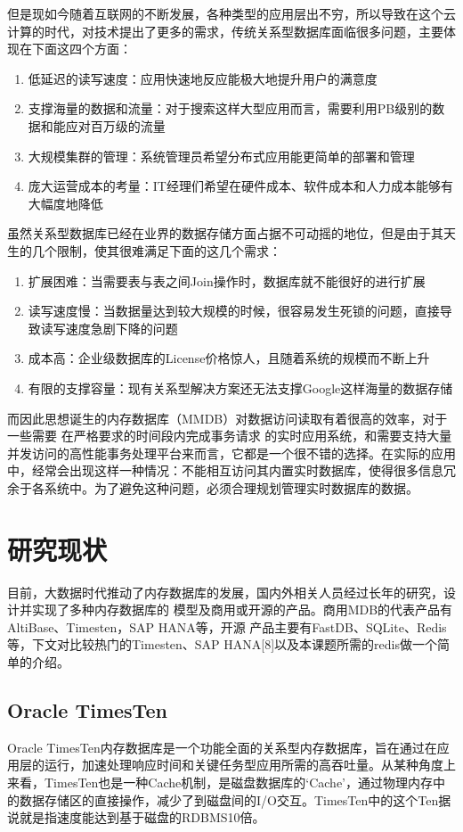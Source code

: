 \documentclass[proposal]{zjutreport}
\begin{document}
但是现如今随着互联网的不断发展，各种类型的应用层出不穷，所以导致在这个云计算的时代，对技术提出了更多的需求，传统关系型数据库面临很多问题，主要体现在下面这四个方面：
\begin{enumerate}[label=（\arabic*）]
\item{低延迟的读写速度：应用快速地反应能极大地提升用户的满意度}
\item{支撑海量的数据和流量：对于搜索这样大型应用而言，需要利用PB级别的数据和能应对百万级的流量}
\item{大规模集群的管理：系统管理员希望分布式应用能更简单的部署和管理}
\item{庞大运营成本的考量：IT经理们希望在硬件成本、软件成本和人力成本能够有大幅度地降低}
\end{enumerate}

虽然关系型数据库已经在业界的数据存储方面占据不可动摇的地位，但是由于其天生的几个限制，使其很难满足下面的这几个需求：
\begin{enumerate}[label=（\arabic*）]
\item{扩展困难：当需要表与表之间Join操作时，数据库就不能很好的进行扩展}
\item{读写速度慢：当数据量达到较大规模的时候，很容易发生死锁的问题，直接导致读写速度急剧下降的问题}
\item{成本高：企业级数据库的License价格惊人，且随着系统的规模而不断上升}
\item{有限的支撑容量：现有关系型解决方案还无法支撑Google这样海量的数据存储}
\end{enumerate}

而因此思想诞生的内存数据库（MMDB）对数据访问读取有着很高的效率，对于一些需要
在严格要求的时间段内完成事务请求
的实时应用系统，和需要支持大量并发访问的高性能事务处理平台来而言，它都是一个很不错的选择。在实际的应用中，经常会出现这样一种情况：不能相互访问其内置实时数据库，使得很多信息冗余于各系统中。为了避免这种问题，必须合理规划管理实时数据库的数据。

\section{研究现状}
目前，大数据时代推动了内存数据库的发展，国内外相关人员经过长年的研究，设计并实现了多种内存数据库的
模型及商用或开源的产品。商用MDB的代表产品有AltiBase、Timesten，SAP HANA等，开源
产品主要有FastDB、SQLite、Redis等，下文对比较热门的Timesten、SAP HANA[8]以及本课题所需的redis做一个简单的介绍。

\subsection{Oracle TimesTen}
Oracle TimesTen内存数据库是一个功能全面的关系型内存数据库，旨在通过在应用层的运行，加速处理响应时间和关键任务型应用所需的高吞吐量。从某种角度上来看，TimesTen也是一种Cache机制，是磁盘数据库的‘Cache’，通过物理内存中的数据存储区的直接操作，减少了到磁盘间的I/O交互。TimesTen中的这个Ten据说就是指速度能达到基于磁盘的RDBMS10倍。
\end{document}

